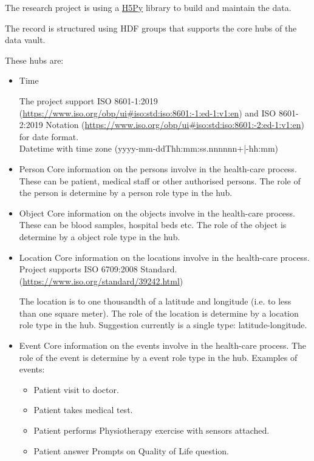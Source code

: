 The research project is using a \href{https://pypi.org/project/h5py/}{H5Py} library to build and maintain the data.

The record is structured using HDF groups that supports the core hubs of the data vault.

These hubs are:

\begin{itemize}
    \item Time
    
    The project support ISO 8601-1:2019 (\url{https://www.iso.org/obp/ui#iso:std:iso:8601:-1:ed-1:v1:en})
    and ISO 8601-2:2019 Notation 
    (\url{https://www.iso.org/obp/ui#iso:std:iso:8601:-2:ed-1:v1:en})
    for date format. \\
    Datetime with time zone (yyyy-mm-ddThh:mm:ss.nnnnnn+|-hh:mm)
    
    
    \item Person
    Core information on the persons involve in the health-care process.
    These can be patient, medical staff or other authorised persons.
    The role of the person is determine by a person role type in the hub.
    
    \item Object
    Core information on the objects involve in the health-care process.
    These can be blood samples, hospital beds etc.
    The role of the object is determine by a object role type in the hub.
    
    \item Location
    Core information on the locations involve in the health-care process.
    Project supports ISO 6709:2008 Standard. (\url{https://www.iso.org/standard/39242.html})
    
    
    The location is to one thousandth of a latitude and longitude (i.e. to less than one square meter).
    The role of the location is determine by a location role type in the hub.
    Suggestion currently is a single type: latitude-longitude.
    
    \item Event
    Core information on the events involve in the health-care process.
    The role of the event is determine by a event role type in the hub.
    Examples of events:
    \begin{itemize}
        \item Patient visit to doctor.
        \item Patient takes medical test.
        \item Patient performs Physiotherapy exercise with sensors attached.
        \item Patient answer Prompts on Quality of Life question.
    \end{itemize}
    
    
\end{itemize}

